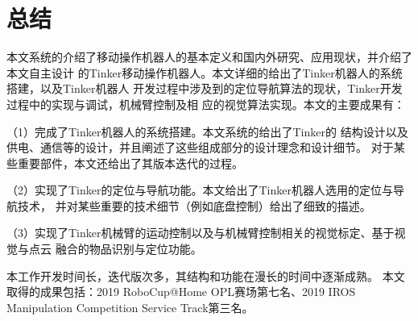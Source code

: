 \chapter{总结}


本文系统的介绍了移动操作机器人的基本定义和国内外研究、应用现状，并介绍了本文自主设计
的Tinker移动操作机器人。本文详细的给出了Tinker机器人的系统搭建，以及Tinker机器人
开发过程中涉及到的定位导航算法的现状，Tinker开发过程中的实现与调试，机械臂控制及相
应的视觉算法实现。本文的主要成果有：

（1）完成了Tinker机器人的系统搭建。本文系统的给出了Tinker的
结构设计以及供电、通信等的设计，并且阐述了这些组成部分的设计理念和设计细节。
对于某些重要部件，本文还给出了其版本迭代的过程。

（2）实现了Tinker的定位与导航功能。本文给出了Tinker机器人选用的定位与导航技术，
并对某些重要的技术细节（例如底盘控制）给出了细致的描述。

（3）实现了Tinker机械臂的运动控制以及与机械臂控制相关的视觉标定、基于视觉与点云
融合的物品识别与定位功能。

本工作开发时间长，迭代版次多，其结构和功能在漫长的时间中逐渐成熟。
本文取得的成果包括：2019 RoboCup@Home OPL赛场第七名、2019 IROS
Manipulation Competition Service Track第三名。